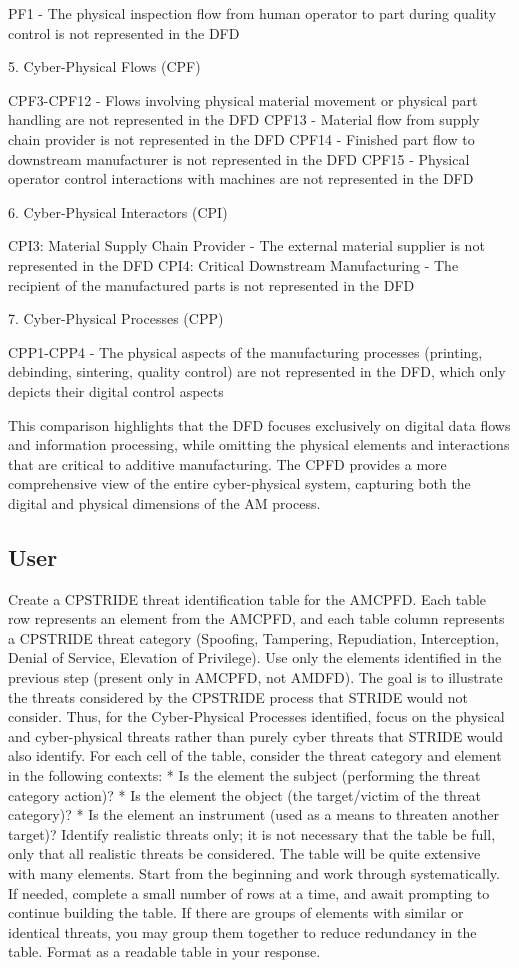 PF1 - The physical inspection flow from human operator to part during quality control is not represented in the DFD

5. Cyber-Physical Flows (CPF)

CPF3-CPF12 - Flows involving physical material movement or physical part handling are not represented in the DFD
CPF13 - Material flow from supply chain provider is not represented in the DFD
CPF14 - Finished part flow to downstream manufacturer is not represented in the DFD
CPF15 - Physical operator control interactions with machines are not represented in the DFD

6. Cyber-Physical Interactors (CPI)

CPI3: Material Supply Chain Provider - The external material supplier is not represented in the DFD
CPI4: Critical Downstream Manufacturing - The recipient of the manufactured parts is not represented in the DFD

7. Cyber-Physical Processes (CPP)

CPP1-CPP4 - The physical aspects of the manufacturing processes (printing, debinding, sintering, quality control) are not represented in the DFD, which only depicts their digital control aspects

This comparison highlights that the DFD focuses exclusively on digital data flows and information processing, while omitting the physical elements and interactions that are critical to additive manufacturing. The CPFD provides a more comprehensive view of the entire cyber-physical system, capturing both the digital and physical dimensions of the AM process.

\subsection{User}
Create a CPSTRIDE threat identification table for the AMCPFD. Each table row represents an element from the AMCPFD, and each table column represents a CPSTRIDE threat category (Spoofing, Tampering, Repudiation, Interception, Denial of Service, Elevation of Privilege). Use only the elements identified in the previous step (present only in AMCPFD, not AMDFD). The goal is to illustrate the threats considered by the CPSTRIDE process that STRIDE would not consider. Thus, for the Cyber-Physical Processes identified, focus on the physical and cyber-physical threats rather than purely cyber threats that STRIDE would also identify. For each cell of the table, consider the threat category and element in the following contexts: * Is the element the subject (performing the threat category action)? * Is the element the object (the target/victim of the threat category)? * Is the element an instrument (used as a means to threaten another target)? Identify realistic threats only; it is not necessary that the table be full, only that all realistic threats be considered. The table will be quite extensive with many elements. Start from the beginning and work through systematically. If needed, complete a small number of rows at a time, and await prompting to continue building the table. If there are groups of elements with similar or identical threats, you may group them together to reduce redundancy in the table. Format as a readable table in your response.

